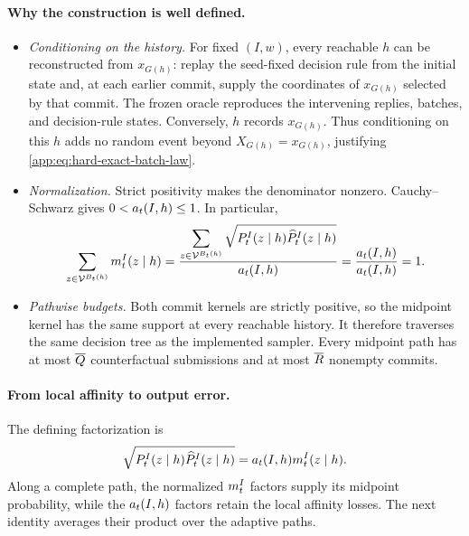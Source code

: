 \paragraph{Why the construction is well defined.}
\begin{itemize}
\item \emph{Conditioning on the history.}
For fixed \((I,w)\), every reachable \(h\) can be reconstructed from
\(x_{G(h)}\): replay the seed-fixed decision rule from the initial state and,
at each earlier commit, supply the coordinates of \(x_{G(h)}\) selected
by that commit. The frozen oracle reproduces the intervening replies,
batches, and decision-rule states. Conversely, \(h\) records \(x_{G(h)}\).
Thus conditioning on this \(h\) adds no random event beyond
\(X_{G(h)}=x_{G(h)}\), justifying
\eqref{app:eq:hard-exact-batch-law}.
\item \emph{Normalization.}
Strict positivity makes the denominator nonzero. Cauchy--Schwarz gives
\(0<a_{t}(I,h)\le1\). In particular,
\[
 \sum_{z\in\mathcal V^{B_t(h)}}m_{t}^{I}(z\mid h)
 =\frac{\displaystyle
   \sum_{z\in\mathcal V^{B_t(h)}}
    \sqrt{P_{t}^{I}(z\mid h)
           \widehat P_{t}^{I}(z\mid h)}}
  {a_{t}(I,h)}
 =\frac{a_{t}(I,h)}{a_{t}(I,h)}
 =1.
\]
\item \emph{Pathwise budgets.}
Both commit kernels are strictly positive, so the midpoint kernel has
the same support at every reachable history. It therefore traverses the
same decision tree as the implemented sampler. Every midpoint path has
at most \(\overline Q{}\) counterfactual submissions and at most
\(\overline R{}\) nonempty commits.
\end{itemize}

\paragraph{From local affinity to output error.}
The defining factorization is
\[
 \sqrt{P_{t}^{I}(z\mid h)
        \widehat P_{t}^{I}(z\mid h)}
 =a_{t}(I,h)m_{t}^{I}(z\mid h).
\]
Along a complete path, the normalized \(m_{t}^{I}\) factors
supply its midpoint probability, while the \(a_{t}(I,h)\)
factors retain the local affinity losses.
The next identity averages their product over the adaptive paths.

